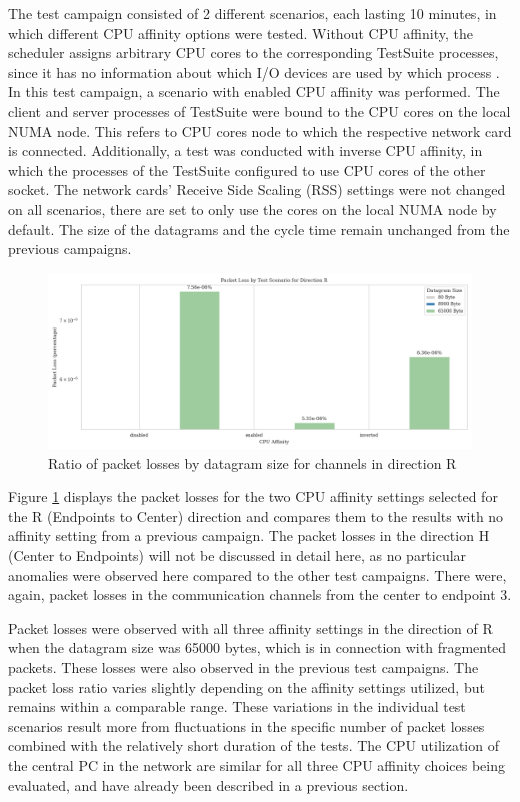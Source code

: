 \documentclass[11pt]{article}
\begin{document}
The test campaign consisted of 2 different scenarios, each lasting 10 minutes, in which different CPU affinity options were tested. Without CPU affinity, the scheduler assigns arbitrary CPU cores to the corresponding TestSuite processes, since it has no information about which I/O devices are used by which process \cite{tbd}. In this test campaign, a scenario with enabled CPU affinity was performed. The client and server processes of TestSuite were bound to the CPU cores on the local NUMA node. This refers to CPU cores node to which the respective network card is connected. Additionally, a test was conducted with inverse CPU affinity, in which the processes of the TestSuite configured to use CPU cores of the other socket.  The network cards' Receive Side Scaling (RSS) settings were not changed on all scenarios, there are set to only use the cores on the local NUMA node by default. The size of the datagrams and the cycle time remain unchanged from the previous campaigns.

\begin{figure}[h]
	\includegraphics[width=\textwidth]{fig8.png}
	\centering
	\caption{Ratio of packet losses by datagram size for channels in direction R}
    \label{fig:fig8}
\end{figure}

Figure \ref{fig:fig8} displays the packet losses for the two CPU affinity settings selected for the R (Endpoints to Center) direction and compares them to the results with no affinity setting from a previous campaign. The packet losses in the direction H (Center to Endpoints) will not be discussed in detail here, as no particular anomalies were observed here compared to the other test campaigns. There were, again, packet losses in the communication channels from the center to endpoint 3.

Packet losses were observed with all three affinity settings in the direction of R when the datagram size was 65000 bytes, which is in connection with fragmented packets. These losses were also observed in the previous test campaigns.  The packet loss ratio varies slightly depending on the affinity settings utilized, but remains within a comparable range. These variations in the individual test scenarios result more from fluctuations in the specific number of packet losses combined with the relatively short duration of the tests. The CPU utilization of the central PC in the network are similar for all three CPU affinity choices being evaluated, and have already been described in a previous section.
\end{document}

